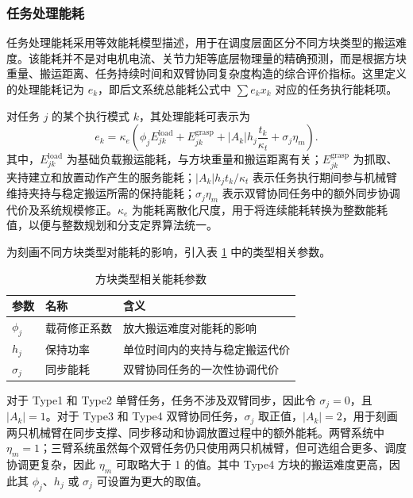 \subsubsection{任务处理能耗}

任务处理能耗采用等效能耗模型描述，用于在调度层面区分不同方块类型的搬运难度。该能耗并不是对电机电流、关节力矩等底层物理量的精确预测，而是根据方块重量、搬运距离、任务持续时间和双臂协同复杂度构造的综合评价指标。这里定义的处理能耗记为 $e_k$，即后文系统总能耗公式中 $\sum e_kx_k$ 对应的任务执行能耗项。

对任务 $j$ 的某个执行模式 $k$，其处理能耗可表示为
\[
    e_k=\kappa_e\left(
    \phi_j E_{jk}^{\mathrm{load}}
    +E_{jk}^{\mathrm{grasp}}
    +|A_k|h_j\frac{t_k}{\kappa_t}
    +\sigma_j\eta_m
    \right).
\]
其中，$E_{jk}^{\mathrm{load}}$ 为基础负载搬运能耗，与方块重量和搬运距离有关；$E_{jk}^{\mathrm{grasp}}$ 为抓取、夹持建立和放置动作产生的服务能耗；$|A_k|h_jt_k/\kappa_t$ 表示任务执行期间参与机械臂维持夹持与稳定搬运所需的保持能耗；$\sigma_j\eta_m$ 表示双臂协同任务中的额外同步协调代价及系统规模修正。$\kappa_e$ 为能耗离散化尺度，用于将连续能耗转换为整数能耗值，以便与整数规划和分支定界算法统一。

为刻画不同方块类型对能耗的影响，引入表 \ref{tab:energy_type_params} 中的类型相关参数。

\begin{table}[H]
    \centering
    \caption{方块类型相关能耗参数}
    \begin{tabular}{
        >{\centering\arraybackslash}p{}
        >{\centering\arraybackslash}p{}
        >{\centering\arraybackslash}p{}
    }
        \toprule
        参数 & 名称 & 含义 \\
        \midrule
        $\phi_j$ & 载荷修正系数 & 放大搬运难度对能耗的影响 \\
        $h_j$ & 保持功率 & 单位时间内的夹持与稳定搬运代价 \\
        $\sigma_j$ & 同步能耗 & 双臂协同任务的一次性协调代价 \\
        \bottomrule
    \end{tabular}
    \label{tab:energy_type_params}
\end{table}

对于 Type1 和 Type2 单臂任务，任务不涉及双臂同步，因此令 $\sigma_j=0$，且 $|A_k|=1$。对于 Type3 和 Type4 双臂协同任务，$\sigma_j$ 取正值，$|A_k|=2$，用于刻画两只机械臂在同步支撑、同步移动和协调放置过程中的额外能耗。两臂系统中 $\eta_m=1$；三臂系统虽然每个双臂任务仍只使用两只机械臂，但可选组合更多、调度协调更复杂，因此 $\eta_m$ 可取略大于 1 的值。其中 Type4 方块的搬运难度更高，因此其 $\phi_j$、$h_j$ 或 $\sigma_j$ 可设置为更大的取值。

